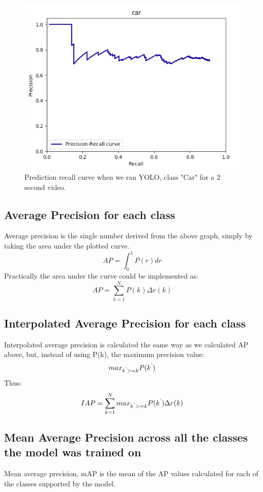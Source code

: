 \documentclass[conference]{IEEEtran}
\newcommand{\figwidthb}{0.80\linewidth}
\begin{document}
\begin{figure}
\centering
\includegraphics[width=\figwidthb]{fig/pr_yolo.png}
\caption{Prediction recall curve when we ran YOLO, class "Car" for a 2 second video.} \label{fig.structure}
\end{figure}

\subsection{Average Precision for each class}
	Average precision is the single number derived from the above graph, simply by taking the area under the plotted curve.
	$${AP} = \int_{0}^{1} P(r) dr$$
	Practically the area under the curve could be implemented as:
	$${AP} = \sum_{k=1}^{N} P(k) {\Delta}r(k)$$
\subsection{Interpolated Average Precision for each class}
	Interpolated average precision is calculated the same way as we calculated {AP} above, but, instead of using {P(k)}, the maximum precision value: 
	$${max}_{k\textsuperscript{'}>= k} {P(k\textsuperscript{'})}$$
	Thus:
	$${IAP} = \sum_{k=1}^{N} {max}_{k\textsuperscript{'}>= k} {P(k\textsuperscript{'})} {\Delta}r(k)$$

\subsection{Mean Average Precision across all the classes the model was trained on}
	Mean average precision, {mAP} is the mean of the {AP} values calculated for each of the classes supported by the model. 
\end{document}
